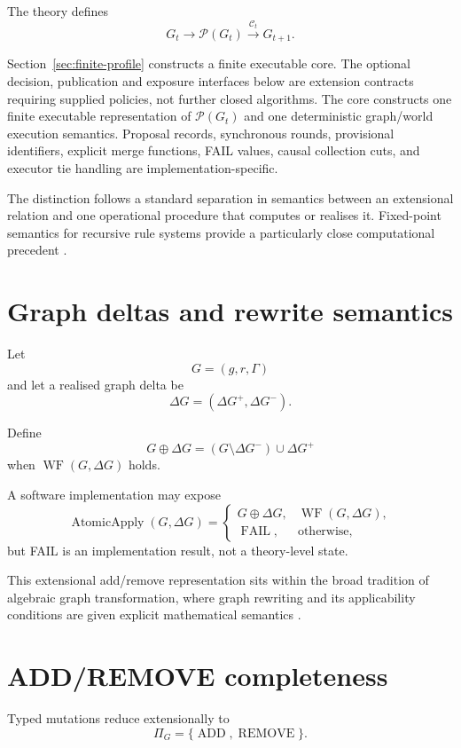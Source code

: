 \documentclass[11pt,a4paper]{article}
\theoremstyle{remark}
\begin{document}
The theory defines
\[
G_t\rightarrow\mathcal P(G_t)\xrightarrow{\mathcal C_t}G_{t+1}.
\]

Section~\ref{sec:finite-profile} constructs a finite executable core. The optional decision, publication and exposure interfaces below are extension contracts requiring supplied policies, not further closed algorithms. The core constructs one finite executable representation of $\mathcal P(G_t)$ and one deterministic graph/world execution semantics. Proposal records, synchronous rounds, provisional identifiers, explicit merge functions, \textsc{FAIL} values, causal collection cuts, and executor tie handling are implementation-specific.

The distinction follows a standard separation in semantics between an extensional relation and one operational procedure that computes or realises it. Fixed-point semantics for recursive rule systems provide a particularly close computational precedent \citep{tarski1955,cousot1977,ceri1989}.

\section{Graph deltas and rewrite semantics}\label{sec:deltas}

Let
\[
G=(g,r,\Gamma)
\]
and let a realised graph delta be
\[
\Delta G=(\Delta G^+,\Delta G^-).
\]

Define
\[
G\oplus\Delta G
=
(G\setminus\Delta G^-)\cup\Delta G^+
\]
when $\operatorname{WF}(G,\Delta G)$ holds.

A software implementation may expose
\[
\operatorname{AtomicApply}(G,\Delta G)=
\begin{cases}
G\oplus\Delta G,&\operatorname{WF}(G,\Delta G),\\
\operatorname{FAIL},&\text{otherwise},
\end{cases}
\]
but \textsc{FAIL} is an implementation result, not a theory-level state.

This extensional add/remove representation sits within the broad tradition of algebraic graph transformation, where graph rewriting and its applicability conditions are given explicit mathematical semantics \citep{corradini1997,ehrig2006}.

\section{ADD/REMOVE completeness}\label{sec:add-remove}

Typed mutations reduce extensionally to
\[
\Pi_G=\{\operatorname{ADD},\operatorname{REMOVE}\}.
\]
\end{document}
